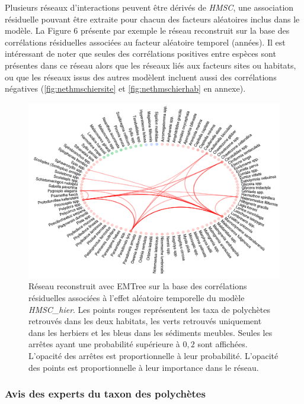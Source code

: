 \documentclass[12pt,]{article}
\makeatletter
\def\maxwidth{\ifdim\Gin@nat@width>\linewidth\linewidth
\else\Gin@nat@width\fi}
\let\Oldincludegraphics\includegraphics
\renewcommand{\includegraphics}[1]{\Oldincludegraphics[width=\maxwidth]{#1}}
\makeatother
\begin{document}
Plusieurs réseaux d'interactions peuvent être dérivés de \emph{HMSC},
une association résiduelle pouvant être extraite pour chacun des
facteurs aléatoires inclus dans le modèle. La Figure 6 présente par
exemple le réseau reconstruit sur la base des corrélations résiduelles
associées au facteur aléatoire temporel (années). Il est intéressant de
noter que seules des corrélations positives entre espèces sont présentes
dans ce réseau alors que les réseaux liés aux facteurs sites ou
habitats, ou que les réseaux issus des autres modèlent incluent aussi
des corrélations négatives (\cref{fig:nethmschiersite} et
\ref{fig:nethmschierhab} en annexe).

\begin{figure}
\hypertarget{fig:hmschierannee}{%
\centering
\includegraphics{figures/hmsc-hier-annee-network-1.png}
\caption{Réseau reconstruit avec EMTree sur la base des corrélations
résiduelles associées à l'effet aléatoire temporelle du modèle
\emph{HMSC\_hier}. Les points rouges représentent les taxa de polychètes
retrouvés dans les deux habitats, les verts retrouvés uniquement dans
les herbiers et les bleus dans les sédiments meubles. Seules les arrêtes
ayant une probabilité supérieure à \(0,2\) sont affichées. L'opacité des
arrêtes est proportionnelle à leur probabilité. L'opacité des points est
proportionnelle à leur importance dans le
réseau.}\label{fig:hmschierannee}
}
\end{figure}

\hypertarget{avis-des-experts-du-taxon-des-polychuxe8tes}{%
\subsubsection{Avis des experts du taxon des
polychètes}\label{avis-des-experts-du-taxon-des-polychuxe8tes}}
\end{document}
